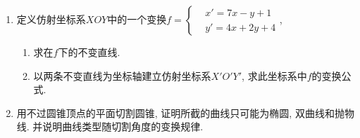 \documentclass[12pt,a4paper,openany]{book}
\begin{document}
\begin{enumerate}
\item 定义仿射坐标系$XOY$中的一个变换$f = \left\{ \begin{aligned} &x' = 7x - y + 1 \\ &y' = 4x + 2y + 4 \end{aligned} \right.$,
\begin{enumerate}
\item 求在$f$下的不变直线.
\item 以两条不变直线为坐标轴建立仿射坐标系$X'O'Y'$, 求此坐标系中$f$的变换公式.
\end{enumerate}

\item 用不过圆锥顶点的平面切割圆锥, 证明所截的曲线只可能为椭圆, 双曲线和抛物线. 并说明曲线类型随切割角度的变换规律.
\end{enumerate}
\end{document}
